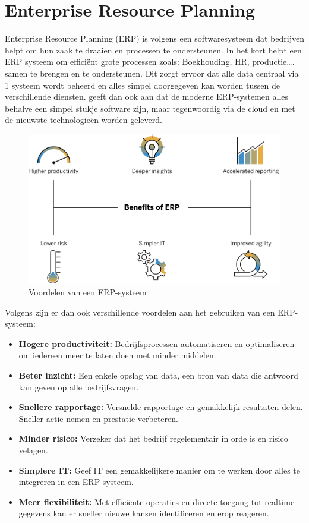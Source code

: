 \section{Enterprise Resource Planning}

Enterprise Resource Planning (ERP) is volgens \textcite{SAPERP} een softwaresysteem dat bedrijven helpt om hun zaak te draaien en processen te ondersteunen. In het kort helpt een ERP systeem om efficiënt grote processen zoals: Boekhouding, HR, productie\ldots. samen te brengen en te ondersteunen. Dit zorgt ervoor dat alle data centraal via 1 systeem wordt beheerd en alles simpel doorgegeven kan worden tussen de verschillende diensten. \textcite{SAPERP} geeft dan ook aan dat de moderne ERP-systemen alles behalve een simpel stukje software zijn, maar tegenwoordig via de cloud en met de nieuwste technologieën worden geleverd.

\begin{figure}[h]
  \centering
  \includegraphics[width=.8\textwidth]{./graphics/erp-benefits}
  \caption{\label{fig:benefitserp}Voordelen van een ERP-systeem \autocite{SAPERP}}
\end{figure}

Volgens \textcite{SAPERP} zijn er dan ook verschillende voordelen aan het gebruiken van een ERP-systeem:
\begin{itemize}
  \item \textbf{Hogere productiviteit:} Bedrijfsprocessen automatiseren en optimaliseren om iedereen meer te laten doen met minder middelen.
  \item \textbf{Beter inzicht:} Een enkele opslag van data, een bron van data die antwoord kan geven op alle bedrijfsvragen.
  \item \textbf{Snellere rapportage:} Versnelde rapportage en gemakkelijk resultaten delen. Sneller actie nemen en prestatie verbeteren.
  \item \textbf{Minder risico:} Verzeker dat het bedrijf regelementair in orde is en risico velagen.
  \item \textbf{Simplere IT:} Geef IT een gemakkelijkere manier om te werken door alles te integreren in een ERP-systeem.
  \item \textbf{Meer flexibiliteit:} Met efficiënte operaties en directe toegang tot realtime gegevens kan er sneller nieuwe kansen identificeren en erop reageren.
\end{itemize}
